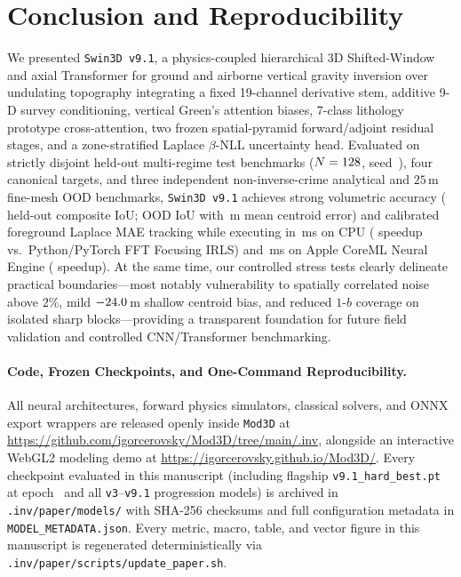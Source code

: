 \documentclass[11pt,a4paper]{article}
\begin{document}
\section{Conclusion and Reproducibility}
\label{sec:conclusion}

We presented \texttt{Swin3D v9.1}, a physics-coupled hierarchical 3D Shifted-Window and axial Transformer for ground and airborne vertical gravity inversion over undulating topography integrating a fixed 19-channel derivative stem, additive 9-D survey conditioning, vertical Green's attention biases, 7-class lithology prototype cross-attention, two frozen spatial-pyramid forward/adjoint residual stages, and a zone-stratified Laplace $\beta$-NLL uncertainty head. Evaluated on strictly disjoint held-out multi-regime test benchmarks ($N=128{}$, seed~\valTestSeed{}), four canonical targets, and three independent non-inverse-crime analytical and $25$\,m fine-mesh OOD benchmarks, \texttt{Swin3D v9.1} achieves strong volumetric accuracy (\valCompIoU{} held-out composite IoU; \valOodMeanSwinIoU{} OOD IoU with \valOodMeanSwinDz{}\,m mean centroid error) and calibrated foreground Laplace MAE tracking while executing in \valTimeOnnxCpuMs{}\,ms on CPU (\valSpeedupOnnxVsFoc{} speedup vs.\ Python/PyTorch FFT Focusing IRLS) and \valTimeCoremlMs{}\,ms on Apple CoreML Neural Engine (\valSpeedupCoremlVsFoc{} speedup). At the same time, our controlled stress tests clearly delineate practical boundaries---most notably vulnerability to spatially correlated noise above $2\%$, mild $-24.0{}$\,m shallow centroid bias, and reduced $1$-$b$ coverage on isolated sharp blocks---providing a transparent foundation for future field validation and controlled CNN/Transformer benchmarking.

\paragraph{Code, Frozen Checkpoints, and One-Command Reproducibility.}
All neural architectures, forward physics simulators, classical solvers, and ONNX export wrappers are released openly inside \texttt{Mod3D} at \url{https://github.com/igorcerovsky/Mod3D/tree/main/.inv}, alongside an interactive WebGL2 modeling demo at \url{https://igorcerovsky.github.io/Mod3D/}. Every checkpoint evaluated in this manuscript (including flagship \texttt{v9.1\_hard\_best.pt} at epoch~\valVNineOneEp{} and all \texttt{v3}--\texttt{v9.1} progression models) is archived in \texttt{.inv/paper/models/} with SHA-256 checksums and full configuration metadata in \texttt{MODEL\_METADATA.json}. Every metric, macro, table, and vector figure in this manuscript is regenerated deterministically via \texttt{.inv/paper/scripts/update\_paper.sh}.
\end{document}
